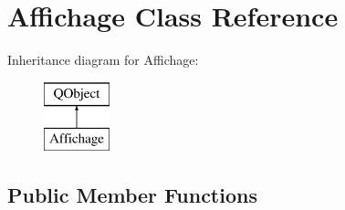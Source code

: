 \hypertarget{class_affichage}{}\section{Affichage Class Reference}
\label{class_affichage}
Inheritance diagram for Affichage\+:\begin{figure}[H]
\begin{center}
\leavevmode
\includegraphics[height=2.000000cm]{class_affichage}
\end{center}
\end{figure}
\subsection*{Public Member Functions}

